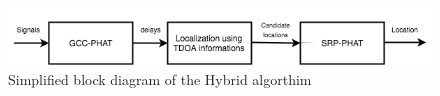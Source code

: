 \begin{figure}[H]
    \centering
    \includegraphics[width=1\textwidth]{Figures/hybridalgo.png}
    \caption{Simplified block diagram of the Hybrid algorthim}
    \label{fig:hybridalgo}
\end{figure}



